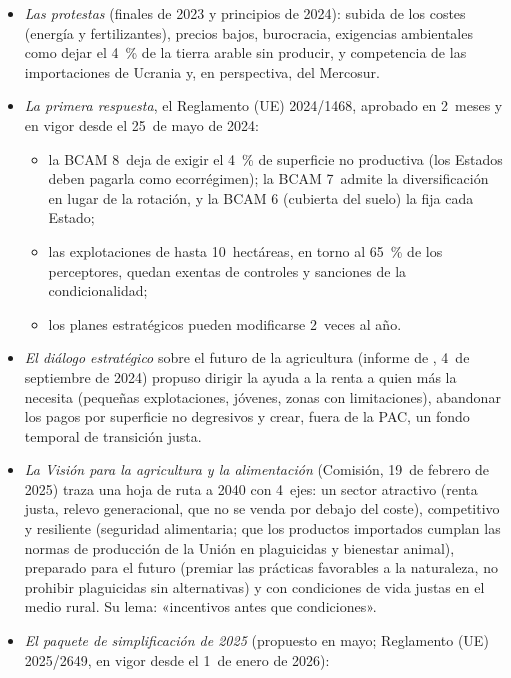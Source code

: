 \documentclass[11pt]{article}
\begin{document}
\begin{itemize}
\item \emph{Las protestas} (finales de 2023 y principios de 2024): subida de los costes (energía y fertilizantes), precios bajos, burocracia, exigencias ambientales como dejar el 4~\% de la tierra arable sin producir, y competencia de las importaciones de Ucrania y, en perspectiva, del Mercosur.
\item \emph{La primera respuesta}, el Reglamento (UE) 2024/1468, aprobado en 2~meses y en vigor desde el 25~de mayo de 2024\nocite{UE2024Simplificacion,PE2026TrenSimplificacion}:
  \begin{itemize}
  \item la BCAM 8~deja de exigir el 4~\% de superficie no productiva (los Estados deben pagarla como ecorrégimen); la BCAM 7~admite la diversificación en lugar de la rotación, y la BCAM 6 (cubierta del suelo) la fija cada Estado;
  \item las explotaciones de hasta 10~hectáreas, en torno al 65~\% de los perceptores, quedan exentas de controles y sanciones de la condicionalidad;
  \item los planes estratégicos pueden modificarse 2~veces al año.
  \end{itemize}
\item \emph{El diálogo estratégico} sobre el futuro de la agricultura (informe de , 4~de septiembre de 2024) propuso dirigir la ayuda a la renta a quien más la necesita (pequeñas explotaciones, jóvenes, zonas con limitaciones), abandonar los pagos por superficie no degresivos y crear, fuera de la PAC, un fondo temporal de transición justa\nocite{DialogoEstrategico2024}.
\item \emph{La Visión para la agricultura y la alimentación} (Comisión, 19~de febrero de 2025) traza una hoja de ruta a 2040 con 4~ejes: un sector atractivo (renta justa, relevo generacional, que no se venda por debajo del coste), competitivo y resiliente (seguridad alimentaria; que los productos importados cumplan las normas de producción de la Unión en plaguicidas y bienestar animal), preparado para el futuro (premiar las prácticas favorables a la naturaleza, no prohibir plaguicidas sin alternativas) y con condiciones de vida justas en el medio rural. Su lema: «incentivos antes que condiciones»\nocite{CE2025Vision}.
\item \emph{El paquete de simplificación de 2025} (propuesto en mayo; Reglamento (UE) 2025/2649, en vigor desde el 1~de enero de 2026)\nocite{UE2025Simplificacion,PE2026TrenSimplificacion}:

\end{itemize}
\end{document}
